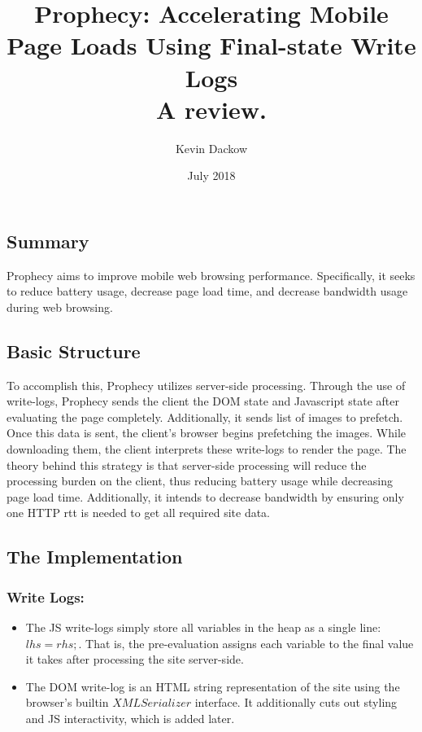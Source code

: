 \documentclass[10pt,letterpaper]{article}
\title{Prophecy: Accelerating Mobile Page Loads Using Final-state Write Logs \\ \textbf{A review.}}
\author{Kevin Dackow}
\date{July 2018}
\begin{document}
		\maketitle
\begin{multicols*}{2}[]
	\section{Summary}
        Prophecy aims to improve mobile web browsing performance. Specifically, it seeks to reduce battery usage, decrease page load time, and decrease bandwidth usage during web browsing.
        \subsection{Basic Structure}
        To accomplish this, Prophecy utilizes server-side processing. Through the use of write-logs, Prophecy sends the client the DOM state and Javascript state after evaluating the page completely. Additionally, it sends list of images to prefetch. Once this data is sent, the client's browser begins prefetching the images. While downloading them, the client interprets these write-logs to render the page. The theory behind this strategy is that server-side processing will reduce the processing burden on the client, thus reducing battery usage while decreasing page load time. Additionally, it intends to decrease bandwidth by ensuring only one HTTP rtt is needed to get all required site data.
        
        \subsection{The Implementation}
        \subsubsection{Write Logs:}
            \begin{itemize}
                \item The JS write-logs simply store all variables in the heap as a single line: $lhs = rhs;$. That is, the pre-evaluation assigns each variable to the final value it takes after processing the site server-side.
                \item The DOM write-log is an HTML string representation of the site using the browser's builtin $XMLSerializer$ interface. It additionally cuts out styling and JS interactivity, which is added later.
            \end{itemize}
        

\end{multicols*}
\end{document}

